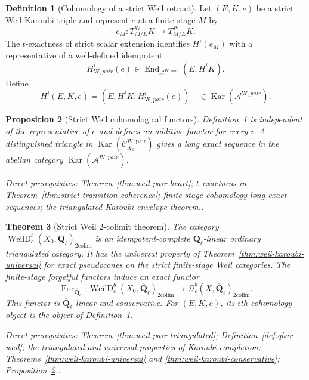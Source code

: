 \documentclass[10pt]{article}
\newtheorem{theorem}{Theorem}[section]
\newtheorem{proposition}[theorem]{Proposition}
\theoremstyle{definition}
\newtheorem{definition}[theorem]{Definition}
\newcommand{\Qlb}{\overline{\mathbf Q}_\ell}
\newcommand{\Dbc}{\mathcal D^b_c}
\newcommand{\End}{\operatorname{End}}
\newcommand{\Kar}{\operatorname{Kar}}
\newcommand{\PairW}{\mathcal C_{X_0}^{\mathrm{W,pair}}}
\newcommand{\depends}[1]{\par\smallskip\noindent\textit{Direct prerequisites:} #1.}
\begin{document}
\begin{definition}[Cohomology of a strict Weil retract]
\label{def:weil-retract-cohomology}
Let $(E,K,e)$ be a strict Weil Karoubi triple and represent $e$ at a finite
stage $M$ by
\[
 e_M:T^{\mathrm W}_{M/E}K\longrightarrow T^{\mathrm W}_{M/E}K.
\]
The $t$-exactness of strict scalar extension identifies $H^i(e_M)$ with a
representative of a well-defined idempotent
\[
 H^i_{\mathrm W,pair}(e)\in
 \End_{\mathcal A^{\mathrm W,pair}}(E,H^iK).
\]
Define
\[
 H^i(E,K,e)=
 (E,H^iK,H^i_{\mathrm W,pair}(e))
 \quad\in\Kar(\mathcal A^{\mathrm W,pair}).
\]
\end{definition}

\begin{proposition}[Strict Weil cohomological functors]
\label{prop:weil-retract-cohomology}
Definition~\ref{def:weil-retract-cohomology} is independent of the
representative of $e$ and defines an additive functor for every $i$.  A
distinguished triangle in $\Kar(\PairW)$ gives a long exact sequence in the
abelian category $\Kar(\mathcal A^{\mathrm W,pair})$.
\depends{Theorem~\ref{thm:weil-pair-heart}; $t$-exactness in
Theorem~\ref{thm:strict-transition-coherence}; finite-stage cohomology long
exact sequences; the triangulated Karoubi-envelope theorem.}
\end{proposition}

\begin{theorem}[Strict Weil 2-colimit theorem]
\label{thm:strict-weil-colimit}
The category
$\operatorname{WeilD}^b_c(X_0,\Qlb)_{\mathrm{2colim}}$ is an
idempotent-complete $\Qlb$-linear ordinary triangulated category.  It has
the universal property of Theorem~\ref{thm:weil-karoubi-universal} for
exact pseudocones on the strict finite-stage Weil categories.  The finite-stage
forgetful functors induce an exact functor
\[
 \operatorname{For}_{\Qlb}:
 \operatorname{WeilD}^b_c(X_0,\Qlb)_{\mathrm{2colim}}
 \longrightarrow\Dbc(X,\Qlb)_{\mathrm{2colim}}.
\]
This functor is $\Qlb$-linear and conservative.  For $(E,K,e)$, its $i$th
cohomology object is the object of
Definition~\ref{def:weil-retract-cohomology}.
\depends{Theorem~\ref{thm:weil-pair-triangulated};
Definition~\ref{def:qbar-weil}; the triangulated and universal properties
of Karoubi completion; Theorems~\ref{thm:weil-karoubi-universal} and
\ref{thm:weil-karoubi-conservative};
Proposition~\ref{prop:weil-retract-cohomology}.}
\end{theorem}
\end{document}
